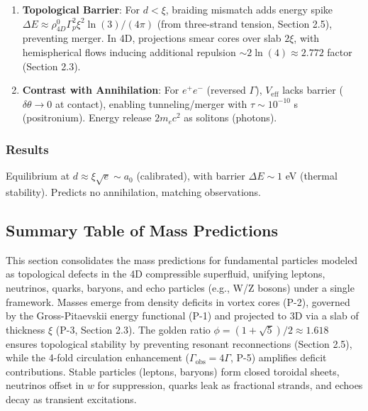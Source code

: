 \begin{enumerate}
\item \textbf{Topological Barrier}: For $d < \xi$, braiding mismatch adds energy spike $\Delta E \approx \rho_{4D}^0 \Gamma_p^2 \xi^2 \ln(3) / (4\pi)$ (from three-strand tension, Section 2.5), preventing merger. In 4D, projections smear cores over slab $2\xi$, with hemispherical flows inducing additional repulsion $\sim 2 \ln(4) \approx 2.772$ factor (Section 2.3).

\item \textbf{Contrast with Annihilation}: For $e^+e^-$ (reversed $\Gamma$), $V_{\text{eff}}$ lacks barrier ($\delta \theta \to 0$ at contact), enabling tunneling/merger with $\tau \sim 10^{-10}$ s (positronium). Energy release $2 m_e c^2$ as solitons (photons).
\end{enumerate}

\subsubsection{Results}

Equilibrium at $d \approx \xi \sqrt{e} \sim a_0$ (calibrated), with barrier $\Delta E \sim 1$ eV (thermal stability). Predicts no annihilation, matching observations.

\medskip
{}

\subsection{Summary Table of Mass Predictions}

This section consolidates the mass predictions for fundamental particles modeled as topological defects in the 4D compressible superfluid, unifying leptons, neutrinos, quarks, baryons, and echo particles (e.g., W/Z bosons) under a single framework. Masses emerge from density deficits in vortex cores (P-2), governed by the Gross-Pitaevskii energy functional (P-1) and projected to 3D via a slab of thickness $\xi$ (P-3, Section 2.3). The golden ratio $\phi = (1 + \sqrt{5})/2 \approx 1.618$ ensures topological stability by preventing resonant reconnections (Section 2.5), while the 4-fold circulation enhancement ($\Gamma_{\text{obs}} = 4\Gamma$, P-5) amplifies deficit contributions. Stable particles (leptons, baryons) form closed toroidal sheets, neutrinos offset in $w$ for suppression, quarks leak as fractional strands, and echoes decay as transient excitations.

